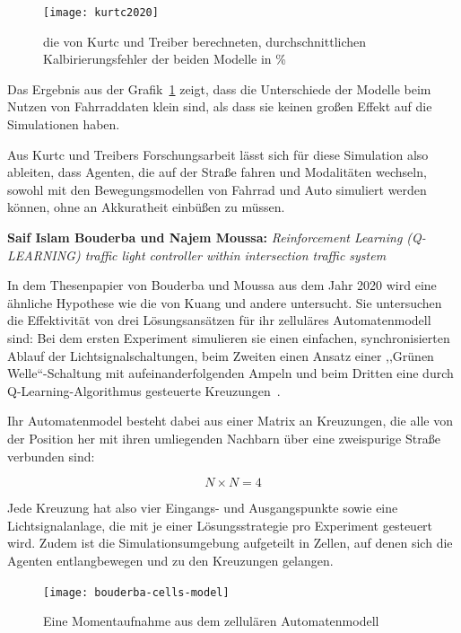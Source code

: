 \begin{figure}[h]
    \centering
    \texttt{[image: kurtc2020]}~\caption{die von Kurtc und Treiber berechneten, durchschnittlichen Kalbirierungsfehler der beiden Modelle in \%~\cite{Kurtc2020}}
    \label{fig:kurtc2020}
\end{figure}

Das Ergebnis aus der Grafik~\ref{fig:kurtc2020} zeigt, dass die Unterschiede der Modelle beim Nutzen von Fahrraddaten klein sind, als dass sie keinen großen Effekt auf die Simulationen haben.

Aus Kurtc und Treibers Forschungsarbeit lässt sich für diese Simulation also ableiten, dass Agenten, die auf der Straße fahren und Modalitäten wechseln, sowohl mit den Bewegungsmodellen von Fahrrad und Auto simuliert werden können, ohne an Akkuratheit einbüßen zu müssen.


\textbf{Saif Islam Bouderba und Najem Moussa:}
\textit{Reinforcement Learning (Q-LEARNING) traffic light controller within intersection traffic system}

In dem Thesenpapier von Bouderba und Moussa aus dem Jahr 2020 wird eine ähnliche Hypothese wie die von Kuang und andere untersucht.
Sie untersuchen die Effektivität von drei Lösungsansätzen für ihr zelluläres Automatenmodell sind:
Bei dem ersten Experiment simulieren sie einen einfachen, synchronisierten Ablauf der Lichtsignalschaltungen, beim Zweiten einen Ansatz einer ,,Grünen Welle``-Schaltung mit aufeinanderfolgenden Ampeln und beim Dritten eine durch Q-Learning-Algorithmus gesteuerte Kreuzungen~\cite{Bouderba2019}.

Ihr Automatenmodel besteht dabei aus einer Matrix an Kreuzungen, die alle von der Position her mit ihren umliegenden Nachbarn über eine zweispurige Straße verbunden sind:

\[N \times N = 4\]

Jede Kreuzung hat also vier Eingangs- und Ausgangspunkte sowie eine Lichtsignalanlage, die mit je einer Lösungsstrategie pro Experiment gesteuert wird.
Zudem ist die Simulationsumgebung aufgeteilt in Zellen, auf denen sich die Agenten entlangbewegen und zu den Kreuzungen gelangen\cite{Bouderba2019}.

\begin{figure}[h]
    \centering
    \texttt{[image: bouderba-cells-model]}~\caption{Eine Momentaufnahme aus dem zellulären Automatenmodell~\cite{Bouderba2019}}
    \label{fig:bouderba-cells-model}
\end{figure}

